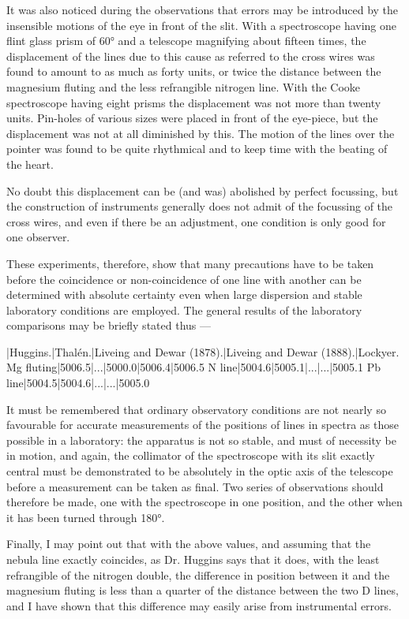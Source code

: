 \documentclass[a4paper, 12pt, oneside, polutonikogreek, english]{article}
\begin{document}
It was also noticed during the observations that errors may be introduced by the insensible motions of the eye in front of the slit. With a spectroscope having one flint glass prism of 60° and a telescope magnifying about fifteen times, the displacement of the lines due to this cause as referred to the cross wires was found to amount to as much as forty units, or twice the distance between the magnesium fluting and the less refrangible nitrogen line. With the Cooke spectroscope having eight prisms the displacement was not more than twenty units. Pin-holes of various sizes were placed in front of the eye-piece, but the displacement was not at all diminished by this. The motion of the lines over the pointer was found to be quite rhythmical and to keep time with the beating of the heart.

No doubt this displacement can be (and was) abolished by perfect focussing, but the construction of instruments generally does not admit of the focussing of the cross wires, and even if there be an adjustment, one condition is only good for one observer.

These experiments, therefore, show that many precautions have to be taken before the coincidence or non-coincidence of one line with another can be determined with absolute certainty even when large dispersion and stable laboratory conditions are employed. The general results of the laboratory comparisons may be briefly stated thus ---

|Huggins.|Thalén.|Liveing and Dewar (1878).|Liveing and Dewar (1888).|Lockyer. 
Mg fluting|5006.5|...|5000.0|5006.4|5006.5 
N line|5004.6|5005.1|...|...|5005.1 
Pb line|5004.5|5004.6|...|...|5005.0 

It must be remembered that ordinary observatory conditions are not nearly so favourable for accurate measurements of the positions of lines in spectra as those possible in a laboratory: the apparatus is not so stable, and must of necessity be in motion, and again, the collimator of the spectroscope with its slit exactly central must be demonstrated to be absolutely in the optic axis of the telescope before a measurement can be taken as final. Two series of observations should therefore be made, one with the spectroscope in one position, and the other when it has been turned through 180°.

Finally, I may point out that with the above values, and assuming that the nebula line exactly coincides, as Dr. Huggins says that it does, with the least refrangible of the nitrogen double, the difference in position between it and the magnesium fluting is less than a quarter of the distance between the two D lines, and I have shown that this difference may easily arise from instrumental errors.
\end{document}
